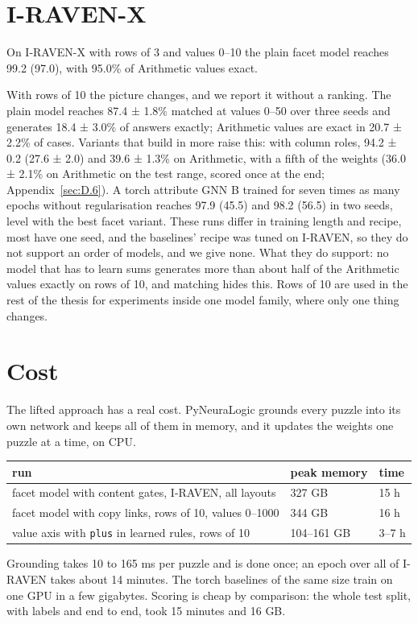\section{I-RAVEN-X}\label{sec:5.7}

On I-RAVEN-X with rows of 3 and values 0–10 the plain facet model reaches 99.2 (97.0), with 95.0\% of Arithmetic values exact.

With rows of 10 the picture changes, and we report it without a ranking. The plain model reaches 87.4 ± 1.8\% matched at values 0–50 over three seeds and generates 18.4 ± 3.0\% of answers exactly; Arithmetic values are exact in 20.7 ± 2.2\% of cases. Variants that build in more raise this: with column roles, 94.2 ± 0.2 (27.6 ± 2.0) and 39.6 ± 1.3\% on Arithmetic, with a fifth of the weights (36.0 ± 2.1\% on Arithmetic on the test range, scored once at the end; Appendix~\ref{sec:D.6}). A torch attribute GNN B trained for seven times as many epochs without regularisation reaches 97.9 (45.5) and 98.2 (56.5) in two seeds, level with the best facet variant. These runs differ in training length and recipe, most have one seed, and the baselines' recipe was tuned on I-RAVEN, so they do not support an order of models, and we give none. What they do support: no model that has to learn sums generates more than about half of the Arithmetic values exactly on rows of 10, and matching hides this. Rows of 10 are used in the rest of the thesis for experiments inside one model family, where only one thing changes.

\section{Cost}\label{sec:5.8}

The lifted approach has a real cost. PyNeuraLogic grounds every puzzle into its own network and keeps all of them in memory, and it updates the weights one puzzle at a time, on CPU.

\begin{center}\small
\begin{tabular}{@{}lll@{}}
\toprule
run & peak memory & time \\
\midrule
facet model with content gates, I-RAVEN, all layouts & 327 GB & 15 h \\
facet model with copy links, rows of 10, values 0–1000 & 344 GB & 16 h \\
value axis with \texttt{plus} in learned rules, rows of 10 & 104–161 GB & 3–7 h \\
\bottomrule
\end{tabular}
\end{center}

Grounding takes 10 to 165 ms per puzzle and is done once; an epoch over all of I-RAVEN takes about 14 minutes. The torch baselines of the same size train on one GPU in a few gigabytes. Scoring is cheap by comparison: the whole test split, with labels and end to end, took 15 minutes and 16 GB.
